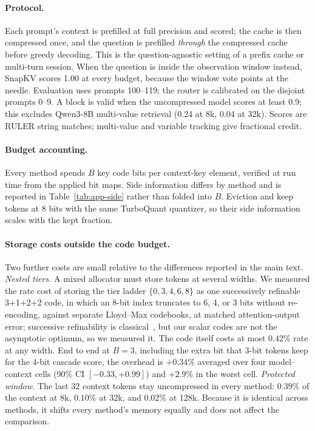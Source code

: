 \paragraph{Protocol.}
Each prompt's context is prefilled at full precision and scored; the cache is
then compressed once, and the question is prefilled \emph{through} the
compressed cache before greedy decoding.  This is the question-agnostic setting
of a prefix cache or multi-turn session.  When the question is inside the
observation window instead, SnapKV scores 1.00 at every budget, because the
window vote points at the needle.  Evaluation uses prompts 100--119; the
\sieve{} router is calibrated on the disjoint prompts 0--9.  A block is valid
when the uncompressed model scores at least 0.9; this excludes Qwen3-8B
multi-value retrieval (0.24 at 8k, 0.04 at 32k).  Scores are RULER string
matches; multi-value and variable tracking give fractional credit.

\paragraph{Budget accounting.}
Every method spends $B$ key code bits per context-key element, verified at run
time from the applied bit maps.  Side information differs by method and is
reported in Table~\ref{tab:app-side} rather than folded into $B$.  Eviction and
\sieve{} keep tokens at 8 bits with the same TurboQuant quantizer, so their
side information scales with the kept fraction.

\paragraph{Storage costs outside the code budget.}
Two further costs are small relative to the differences reported in the main
text.  \emph{Nested tiers.}  A mixed allocator must store tokens at several
widths.  We measured the rate cost of storing the tier ladder
$\{0,3,4,6,8\}$ as one successively refinable 3+1+2+2 code, in which an 8-bit
index truncates to 6, 4, or 3 bits without re-encoding, against separate
Lloyd--Max codebooks, at matched attention-output error; successive refinability is classical~\citep{equitz1991successive}, but our scalar codes are not the asymptotic optimum, so we measured it.  The code itself costs
at most $0.42\%$ rate at any width.  End to end at $B=3$, including the extra
bit that 3-bit tokens keep for the 4-bit cascade score, the overhead is
$+0.34\%$ averaged over four model--context cells (90\% CI $[-0.33,+0.99]$) and
$+2.9\%$ in the worst cell.  \emph{Protected window.}  The last 32 context
tokens stay uncompressed in every method: $0.39\%$ of the context at 8k,
$0.10\%$ at 32k, and $0.02\%$ at 128k.  Because it is identical across methods,
it shifts every method's memory equally and does not affect the comparison.

